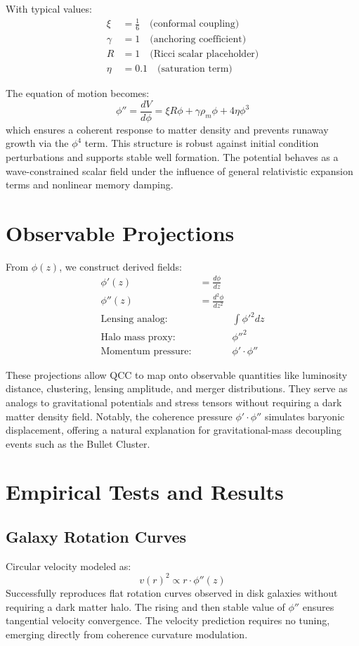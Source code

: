 \documentclass[11pt]{article}
\begin{document}
With typical values:
\begin{align*}
\xi &= \frac{1}{6} \quad \text{(conformal coupling)} \\
\gamma &= 1 \quad \text{(anchoring coefficient)} \\
R &= 1 \quad \text{(Ricci scalar placeholder)} \\
\eta &= 0.1 \quad \text{(saturation term)}
\end{align*}

The equation of motion becomes:
\begin{equation}
\phi'' = \frac{dV}{d\phi} = \xi R \phi + \gamma \rho_m \phi + 4\eta \phi^3
\end{equation}
which ensures a coherent response to matter density and prevents runaway growth via the \( \phi^4 \) term. This structure is robust against initial condition perturbations and supports stable well formation. The potential behaves as a wave-constrained scalar field under the influence of general relativistic expansion terms and nonlinear memory damping.

\section{Observable Projections}
From \( \phi(z) \), we construct derived fields:
\begin{align}
\phi'(z) &= \frac{d\phi}{dz} \\
\phi''(z) &= \frac{d^2\phi}{dz^2} \\
\text{Lensing analog:} && \int \phi'^2 dz \\
\text{Halo mass proxy:} && \phi''^2 \\
\text{Momentum pressure:} && \phi' \cdot \phi''
\end{align}

These projections allow QCC to map onto observable quantities like luminosity distance, clustering, lensing amplitude, and merger distributions. They serve as analogs to gravitational potentials and stress tensors without requiring a dark matter density field. Notably, the coherence pressure \( \phi' \cdot \phi'' \) simulates baryonic displacement, offering a natural explanation for gravitational-mass decoupling events such as the Bullet Cluster.

\section{Empirical Tests and Results}

\subsection{Galaxy Rotation Curves}
Circular velocity modeled as:
\begin{equation}
v(r)^2 \propto r \cdot \phi''(z)
\end{equation}
Successfully reproduces flat rotation curves observed in disk galaxies without requiring a dark matter halo. The rising and then stable value of \( \phi'' \) ensures tangential velocity convergence. The velocity prediction requires no tuning, emerging directly from coherence curvature modulation.
\end{document}
